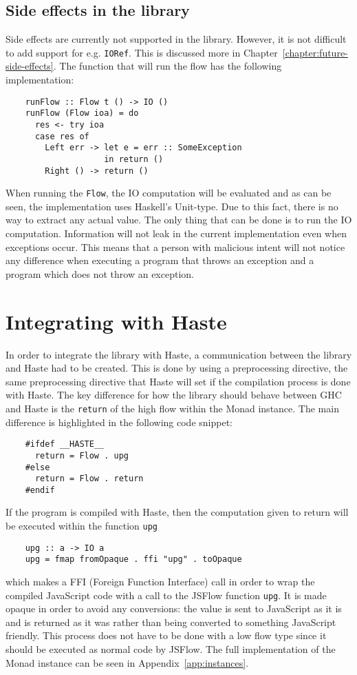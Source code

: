 \subsection{Side effects in the library}
\label{chapter:side-effects-library}
Side effects are currently not supported in the library. However, it is not difficult to add support for e.g. {\tt IORef}. This is discussed more in Chapter~\ref{chapter:future-side-effects}. The function that will run the flow has the following implementation:
\begin{verbatim}
    runFlow :: Flow t () -> IO ()
    runFlow (Flow ioa) = do
      res <- try ioa
      case res of
        Left err -> let e = err :: SomeException
                    in return ()
        Right () -> return ()
\end{verbatim}
When running the {\tt Flow}, the IO computation will be evaluated and as can be seen, the implementation uses Haskell's Unit-type. Due to this fact, there is no way to extract any actual value. The only thing that can be done is to run the IO computation. Information will not leak in the current implementation even when exceptions occur. This means that a person with malicious intent will not notice any difference when executing a program that throws an exception and a program which does not throw an exception.

\section{Integrating with Haste}
\label{chapter:incorporating-with-haste}
In order to integrate the library with Haste, a communication between the library and Haste had to be created. This is done by using a preprocessing directive, the same preprocessing directive that Haste will set if the compilation process is done with Haste. The key difference for how the library should behave between GHC and Haste is the {\tt return} of the high flow within the Monad instance. The main difference is highlighted in the following code snippet:
\begin{verbatim}
    #ifdef __HASTE__
      return = Flow . upg
    #else
      return = Flow . return
    #endif
\end{verbatim}
If the program is compiled with Haste, then the computation given to return will be executed within the function {\tt upg}
\begin{verbatim}
    upg :: a -> IO a
    upg = fmap fromOpaque . ffi "upg" . toOpaque
\end{verbatim}
which makes a FFI (Foreign Function Interface) call in order to wrap the compiled JavaScript code with a call to the JSFlow function {\tt upg}. It is made opaque in order to avoid any conversions: the value is sent to JavaScript as it is and is returned as it was rather than being converted to something JavaScript friendly. This process does not have to be done with a low flow type since it should be executed as normal code by JSFlow. The full implementation of the Monad instance can be seen in Appendix~\ref{app:instances}.

